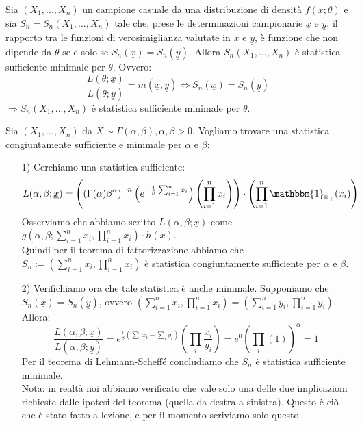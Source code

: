 \begin{thm}
Sia \((X_1,...,X_n)\) un campione casuale da una distribuzione di densità \(f(x;\theta)\) e sia $S_n=S_n(X_1,...,X_n)$ tale che, prese le determinazioni campionarie $\underline{x}$ e $\underline{y}$, il rapporto tra le funzioni di verosimiglianza valutate in $\underline{x}$ e $\underline{y}$, è funzione che non dipende da $\theta$ se e solo se $S_n(\underline{x})=S_n(\underline{y})$. Allora $S_n(X_1,...,X_n)$ è statistica sufficiente minimale per $\theta$. Ovvero:
$$\frac{L(\theta;\underline{x})}{L(\theta;\underline{y})}=m(\underline{x},\underline{y}) \Longleftrightarrow S_n(\underline{x})=S_n(\underline{y})$$
$\Longrightarrow S_n(X_1,...,X_n)$ è statistica sufficiente minimale per $\theta$.
\end{thm}

\begin{esempio} Sia $(X_1,...,X_n)$ da $X \sim \Gamma(\alpha,\beta), \alpha, \beta >0$. Vogliamo trovare una statistica congiuntamente sufficiente e minimale per $\alpha$ e $\beta$:
\begin{enumerate}
\item [1)] Cerchiamo una statistica sufficiente:
$$L(\alpha,\beta;\underline{x}) = \left( \left( \Gamma(\alpha)\beta^{\alpha}\right)^{-n} \left( e^{-\frac{1}{\beta} \sum_{i=1}^n x_i} \right) \left( \prod_{i=1}^n x_i \right) \right) \cdot \left( \prod_{i=1}^n \mathbbm{1}_{\mathbb{R_+}}(x_i) \right)$$
Osserviamo che abbiamo scritto $L(\alpha,\beta;\underline{x})$ come $g \left( \alpha,\beta; \sum_{i=1}^n x_i, \prod_{i=1}^n x_i \right) \cdot h(\underline{x})$.\\
Quindi per il teorema di fattorizzazione abbiamo che $S_n:=\left( \sum_{i=1}^n x_i, \prod_{i=1}^n x_i \right)$ è statistica congiuntamente sufficiente per $\alpha$ e $\beta$.
\item [2)] Verifichiamo ora che tale statistica è anche minimale. Supponiamo che $S_n(\underline{x})=S_n(\underline{y})$, ovvero $\left( \sum_{i=1}^n x_i, \prod_{i=1}^n x_i \right) = \left( \sum_{i=1}^n y_i, \prod_{i=1}^n y_i \right)$. Allora:
$$\frac{L(\alpha,\beta;\underline{x})}{L(\alpha,\beta;\underline{y})} = e^{\frac{1}{\beta} \left( \sum_i x_i - \sum_i y_i \right)} \left( \prod_i \frac{x_i}{y_i} \right) = e^{0} \left( \prod_i (1) \right)^{\alpha} = 1$$
Per il teorema di Lehmann-Scheffé concludiamo che $S_n$ è statistica sufficiente minimale.\\
Nota: in realtà noi abbiamo verificato che vale solo una delle due implicazioni richieste dalle ipotesi del teorema (quella da destra a sinistra). Questo è ciò che è stato fatto a lezione, e per il momento scriviamo solo questo.
\end{enumerate}
\end{esempio}

